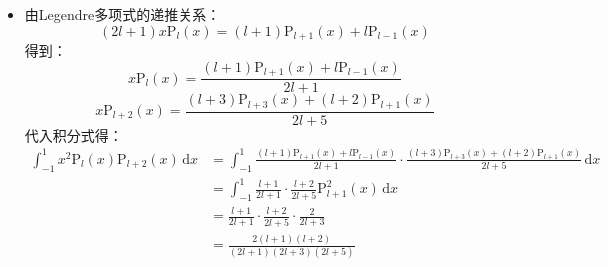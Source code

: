\documentclass[fontset=windows]{ctexart}
\begin{document}
\begin{itemize}
\[    \]
    由于$k+l=2a+1\ (a\in\mathbb{N})$，不妨设$k=2s$，$l=2t+1$，则：
    \begin{align*}
    \int_{0}^{1}\mathrm{P}_k(x)\mathrm{P}_l(x)\,\mathrm{d}x
    &= \frac{\mathrm{P}_l(0)\mathrm{P}'_k(0) - \mathrm{P}_k(0)\mathrm{P}'_l(0)}{2s(2s+1)-(2t+1)(2t+2)} \\
    &= \frac{1}{2s(2s+1)-(2t+1)(2t+2)}\left[0-\frac{(-1)^s(2s)!}{(2^s s!)^2}\cdot\frac{(-1)^t (2t+2)!}{2^{2t+1} t!(t+1)!}\right] \\
    &= \frac{1}{2s(2s+1)-(2t+1)(2t+2)}\cdot\frac{(-1)^{s+t+1}(2s)!(2t+2)!}{2^{2s+2t+1} (s!)^2 t!(t+1)!} \\
    &= \frac{-1}{2s(2s+1)-(2t+1)(2t+2)}\cdot\frac{(-1)^{s+t}(2s)!(2t+1)!(2t+2)}{2^{2s+2t} (s!t!)^2\cdot2(t+1)} \\
    &= \frac{(-1)^{s+t}}{(2t+1)(2t+2)-2s(2s+1)}\cdot\frac{(2s)!(2t+1)!}{2^{2s+2t} (s!t!)^2}
    \end{align*}
    综上：
    \[
    \int_{0}^{1}\mathrm{P}_k(x)\mathrm{P}_l(x)\,\mathrm{d}x =
    \left\{
    \begin{aligned}
        &\ \frac{(-1)^{s+t}\gamma_{kl}}{(2t+1)(2t+2)-2s(2s+1)}\cdot\frac{(2s)!(2t+1)!}{2^{2s+2t} (s!t!)^2},\qquad &k+l=2a+1 \\
        &\ \frac{1}{2l+1}\delta_{kl},\qquad &k+l=2a
    \end{aligned}
    \right.
    \]
    其中$a,s,t\in\mathbb{N}$，$s=\left[\dfrac{k}{2}\right]$，$t=\left[\dfrac{l}{2}\right]$，且
    \[
    \gamma_{kl} =
    \left\{
    \begin{aligned}
        &\ 1,\qquad &k=2s \\
        &\ -1,\qquad &k=2s+1
    \end{aligned}
    \right.
    \]
    \bigskip

    \item[3.(5)]
    由Legendre多项式的递推关系：
    \[
    (2l+1)x\mathrm{P}_l(x) = (l+1)\mathrm{P}_{l+1}(x)+l\mathrm{P}_{l-1}(x)
    \]
    得到：
    \[
    x\mathrm{P}_l(x) = \frac{(l+1)\mathrm{P}_{l+1}(x)+l\mathrm{P}_{l-1}(x)}{2l+1}
    \]
    \[
    x\mathrm{P}_{l+2}(x) = \frac{(l+3)\mathrm{P}_{l+3}(x)+(l+2)\mathrm{P}_{l+1}(x)}{2l+5}
    \]
    代入积分式得：
    \begin{align*}
        \int_{-1}^{1}x^2\mathrm{P}_l(x)\mathrm{P}_{l+2}(x)\,\mathrm{d}x
        &= \int_{-1}^{1}\frac{(l+1)\mathrm{P}_{l+1}(x)+l\mathrm{P}_{l-1}(x)}{2l+1}\cdot\frac{(l+3)\mathrm{P}_{l+3}(x)+(l+2)\mathrm{P}_{l+1}(x)}{2l+5}\,\mathrm{d}x \\
        &= \int_{-1}^{1}\frac{l+1}{2l+1}\cdot\frac{l+2}{2l+5}\mathrm{P}_{l+1}^2(x)\,\mathrm{d}x \\
        &= \frac{l+1}{2l+1}\cdot\frac{l+2}{2l+5}\cdot\frac{2}{2l+3} \\
        &= \frac{2(l+1)(l+2)}{(2l+1)(2l+3)(2l+5)}
    \end{align*}
    \bigskip


\end{itemize}
\end{document}
